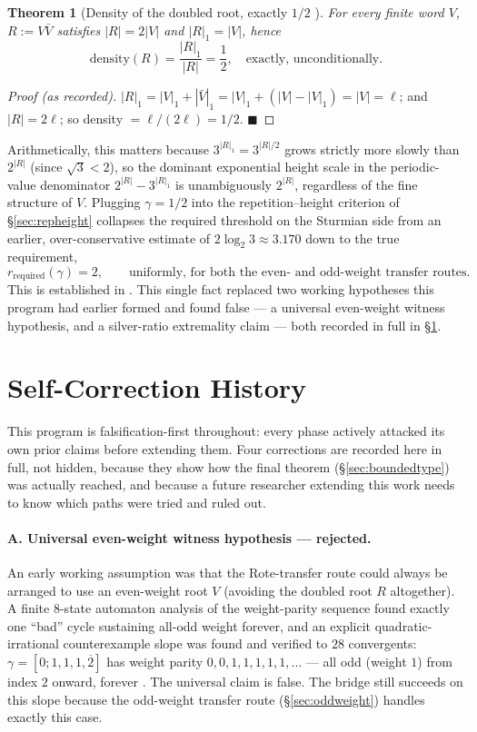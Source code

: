 \documentclass[11pt]{article}
\newtheorem{theorem}{Theorem}[section]
\begin{document}
\begin{theorem}[Density of the doubled root, exactly $1/2$ \cite{Phase4Required}]
For every finite word $V$, $R:=V\bar V$ satisfies $|R|=2|V|$ and $|R|_1=|V|$, hence
\[
\text{density}(R) = \frac{|R|_1}{|R|} = \frac12, \quad\text{exactly, unconditionally.}
\]
\end{theorem}
\begin{proof}[Proof (as recorded)]
$|R|_1 = |V|_1 + |\bar V|_1 = |V|_1 + (|V|-|V|_1) = |V| = \ell$; and $|R|=2\ell$; so density $=\ell/(2\ell)=1/2$. $\blacksquare$
\end{proof}

Arithmetically, this matters because $3^{|R|_1}=3^{|R|/2}$ grows strictly more slowly than $2^{|R|}$ (since $\sqrt3<2$), so the dominant exponential height scale in the periodic-value denominator $2^{|R|}-3^{|R|_1}$ is unambiguously $2^{|R|}$, regardless of the fine structure of $V$. Plugging $\gamma=1/2$ into the repetition--height criterion of \S\ref{sec:repheight} collapses the required threshold on the Sturmian side from an earlier, over-conservative estimate of $2\log_2 3\approx3.170$ down to the true requirement,
\[
r_{\text{required}}(\gamma) = 2, \qquad\text{uniformly, for both the even- and odd-weight transfer routes.}
\]
This is established in \cite{Phase4Required}. This single fact replaced two working hypotheses this program had earlier formed and found false --- a universal even-weight witness hypothesis, and a silver-ratio extremality claim --- both recorded in full in \S\ref{sec:selfcorrection}.

\section{Self-Correction History}
\label{sec:selfcorrection}

This program is falsification-first throughout: every phase actively attacked its own prior claims before extending them. Four corrections are recorded here in full, not hidden, because they show how the final theorem (\S\ref{sec:boundedtype}) was actually reached, and because a future researcher extending this work needs to know which paths were tried and ruled out.

\paragraph{A. Universal even-weight witness hypothesis --- rejected.} An early working assumption was that the Rote-transfer route could always be arranged to use an even-weight root $V$ (avoiding the doubled root $R$ altogether). A finite $8$-state automaton analysis of the weight-parity sequence found exactly one ``bad'' cycle sustaining all-odd weight forever, and an explicit quadratic-irrational counterexample slope was found and verified to $28$ convergents: $\gamma=[0;1,1,1,\overline{2}]$ has weight parity $0,0,1,1,1,1,1,\ldots$ --- all odd (weight $1$) from index $2$ onward, forever \cite{Phase3Automaton}. The universal claim is false. The bridge still succeeds on this slope because the odd-weight transfer route (\S\ref{sec:oddweight}) handles exactly this case.
\end{document}
